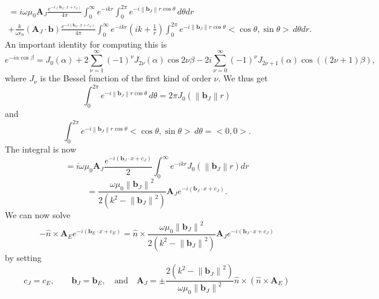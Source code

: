 \documentclass{article}
\newcommand{\norm}[1]{\left\lVert #1 \right\rVert}
\theoremstyle{plain}
\begin{document}
\begin{multline}
	=i\omega\mu_0 \mathbf{A}_J\frac{e^{-i(\mathbf{b}_J\cdot x + c_J)}}{4\pi}
	\int_0^\infty e^{-ikr} \int_0^{2\pi} e^{-i\norm{\mathbf{b}_J}r\cos{\theta}} \,d\theta dr \\
	+ \frac{k}{\omega\epsilon_0}(\mathbf{A}_J\cdot\mathbf{b})\frac{e^{-i(\mathbf{b}_J\cdot x + c_J)}}{4\pi}
	\int_0^\infty e^{-ikr}\left( ik + \frac{1}{r} \right) \int_0^{2\pi} e^{-i\norm{\mathbf{b}_J}r\cos{\theta}} <\cos{\theta},\sin{\theta}> \,d\theta dr.
\end{multline}
An important identity for computing this is
\begin{equation}
	e^{-i\alpha\cos{\beta}}
	= J_0(\alpha) + 2\sum_{\nu=1}^\infty (-1)^\nu J_{2\nu}(\alpha)\cos{2\nu\beta} 
	- 2i\sum_{\nu=0}^\infty (-1)^\nu J_{2\nu+1}(\alpha)\cos{\left((2\nu+1)\beta\right)},
\end{equation}
where $J_\nu$ is the Bessel function of the first kind of order $\nu$.
We thus get
\begin{equation}
	\int_0^{2\pi} e^{-i\norm{\mathbf{b}_J}r\cos{\theta}} \,d\theta = 2\pi J_0(\norm{\mathbf{b}_J}r)
\end{equation}
and
\begin{equation}
	\int_0^{2\pi} e^{-i\norm{\mathbf{b}_J}r\cos{\theta}} <\cos{\theta},\sin{\theta}> \,d\theta = <0,0>.
\end{equation}
The integral is now
\begin{equation}
	=i\omega\mu_0 \mathbf{A}_J\frac{e^{-i(\mathbf{b}_J\cdot x + c_J)}}{2}
	\int_0^\infty e^{-ikr} J_0(\norm{\mathbf{b}_J}r) dr
\end{equation}
\begin{equation}
	= \frac{\omega\mu_0\norm{\mathbf{b}_J}^2}{2\left(k^2 - \norm{\mathbf{b}_J}^2\right)} \mathbf{A}_J e^{-i(\mathbf{b}_J\cdot x + c_J)}.
\end{equation}
We can now solve
\begin{equation}
	-\hat{n}\times\mathbf{A}_E e^{-i(\mathbf{b}_E\cdot x + c_E)}
	= \hat{n}\times\frac{\omega\mu_0\norm{\mathbf{b}_J}^2}{2\left(k^2 - \norm{\mathbf{b}_J}^2\right)} \mathbf{A}_J e^{-i(\mathbf{b}_J\cdot x + c_J)}
\end{equation}
by setting
\begin{equation}
	c_J = c_E, \quad\quad \mathbf{b}_J = \mathbf{b}_E, \quad\text{and}\quad
	\mathbf{A}_J = \pm \frac{2\left(k^2 - \norm{\mathbf{b}_J}^2\right)}{\omega\mu_0\norm{\mathbf{b}_J}^2} \hat{n}\times( \hat{n}\times\mathbf{A}_E )
\end{equation}







\end{document}
